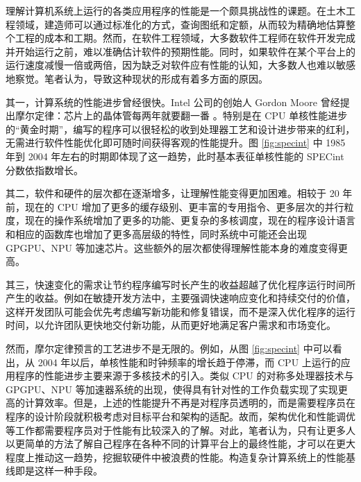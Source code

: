 
理解计算机系统上运行的各类应用程序的性能是一个颇具挑战性的课题。在土木工程领域，建造师可以通过标准化的方式，查询图纸和定额，从而较为精确地估算整个工程的成本和工期。然而，在软件工程领域，大多数软件工程师在软件开发完成并开始运行之前，难以准确估计软件的预期性能。同时，如果软件在某个平台上的运行速度减慢一倍或两倍，{\amend 因为缺乏对软件应有性能的认知}，大多数人也难以敏感地察觉。笔者认为，导致这种现状的形成有着多方面的原因。


其一，计算系统的性能进步曾经很快。Intel 公司的创始人 Gordon Moore 曾经提出摩尔定律：芯片上的晶体管每两年就要翻一番 \cite{MooreLaw}。特别是在 CPU 单核性能进步的“黄金时期”，编写的程序可以很轻松的收到处理器工艺和设计进步带来的红利，无需进行软件性能优化即可随时间获得客观的性能提升。图 \ref{fig:specint} 中 1985 年到 2004 年左右的时期即体现了这一趋势，此时基本表征单核性能的 SPECint 分数依指数增长。

其二，软件和硬件的层次都在逐渐增多，让理解性能变得更加困难。相较于 20 年前，现在的 CPU 增加了更多的缓存级别、更丰富的专用指令、更多层次的并行粒度，现在的操作系统增加了更多的功能、更复杂的多核调度，现在的程序设计语言和相应的函数库也增加了更多高层级的特性，同时系统中可能还会出现 GPGPU、NPU 等加速芯片。这些额外的层次都使得理解性能本身的难度变得更高。

其三，快速变化的需求让节约程序编写时长产生的收益超越了优化程序运行时间所产生的收益。例如在敏捷开发方法中，主要强调快速响应变化和持续交付的价值，这样开发团队可能会优先考虑编写新功能和修复错误，而不是深入优化程序的运行时间，以允许团队更快地交付新功能，从而更好地满足客户需求和市场变化。

然而，摩尔定律预言的工艺进步不是无限的。例如，从图 \ref{fig:specint} 中可以看出，从 2004 年以后，单核性能和时钟频率的增长趋于停滞，而 CPU 上运行的应用程序的性能进步主要来源于多核技术的引入。类似 CPU 的对称多处理器技术与 GPGPU、NPU 等加速器系统的出现，使得具有针对性的工作负载实现了实现更高的计算效率。但是，上述的性能提升不再是对程序员透明的，而是需要程序员在程序的设计阶段就积极考虑对目标平台和架构的适配。故而，架构优化和性能调优等工作都需要程序员对于性能有比较深入的了解。对此，笔者认为，只有让更多人以更简单的方法了解自己程序在各种不同的计算平台上的最终性能，才可以在更大程度上推动这一趋势，挖掘软硬件中被浪费的性能。构造复杂计算系统上的性能基线即是这样一种手段。

